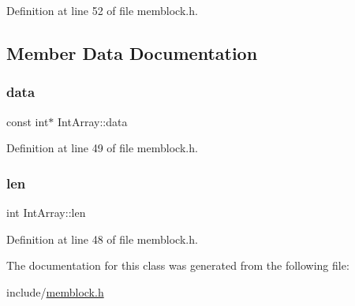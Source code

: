 Definition at line 52 of file memblock.\+h.



\subsection{Member Data Documentation}
\mbox{\label{class_int_array_a5e9f0ecac061ffdba83396e7eeeb49e6}} 
\subsubsection{\texorpdfstring{data}{data}}
{\footnotesize\ttfamily const int$\ast$ Int\+Array\+::data}



Definition at line 49 of file memblock.\+h.

\mbox{\label{class_int_array_a5221f2c5a60b4406fc645b7fe1971a27}} 
\subsubsection{\texorpdfstring{len}{len}}
{\footnotesize\ttfamily int Int\+Array\+::len}



Definition at line 48 of file memblock.\+h.



The documentation for this class was generated from the following file\+:\begin{DoxyCompactItemize}
\item 
include/\hyperlink{memblock_8h}{memblock.\+h}\end{DoxyCompactItemize}
